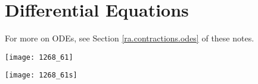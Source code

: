 \chapter{Differential Equations}\label{diffeq.sec}

For more on ODEs, see Section \ref{ra.contractions.odes} of these notes.

\texttt{[image: 1268\_61]}

\texttt{[image: 1268\_61s]}